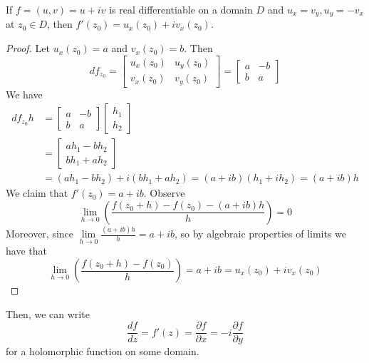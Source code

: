\begin{theorem}
    If $f = (u,v) = u+iv$ is real differentiable on a domain $D$ and $u_x = v_y, u_y = -v_x$ at $z_0 \in D$, then $f'(z_0) = u_x(z_0) + iv_x(z_0)$.
\end{theorem}
\begin{proof}
    Let $u_x(z_0) = a$ and $v_x(z_0) = b$. Then $$df_{z_0} = \begin{bmatrix} u_x(z_0) & u_y(z_0) \\ v_x(z_0) & v_y(z_0) \end{bmatrix} = \begin{bmatrix} a & -b \\ b & a \end{bmatrix}$$
    We have \begin{align*}
        df_{z_0}h &= \begin{bmatrix} a & -b \\ b & a \end{bmatrix}\begin{bmatrix} h_1 \\ h_2\end{bmatrix} \\
            &= \begin{bmatrix} ah_1-bh_2 \\ bh_1+ah_2 \end{bmatrix} \\
                &= (ah_1-bh_2) +i(bh_1+ah_2) = (a+ib)(h_1+ih_2) = (a+ib)h
    \end{align*}
    We claim that $f'(z_0) = a+ib$. Observe \begin{equation*}
        \lim\limits_{h\rightarrow 0} \left(\frac{f(z_0+h) - f(z_0) - (a+ib)h}{h}\right) = 0
    \end{equation*}
    Moreover, since $\lim\limits_{h\rightarrow 0}\frac{(a+ib)h}{h} = a+ib$, so by algebraic properties of limits we have that \begin{equation*}
        \lim\limits_{h\rightarrow 0} \left(\frac{f(z_0+h) - f(z_0)}{h}\right) = a+ib = u_x(z_0)+iv_x(z_0)
    \end{equation*}
\end{proof}

Then, we can write \begin{equation*}
    \boxed{\frac{df}{dz} = f'(z) = \frac{\partial f}{\partial x} = -i\frac{\partial f}{\partial y}}
\end{equation*}
for a holomorphic function on some domain.



